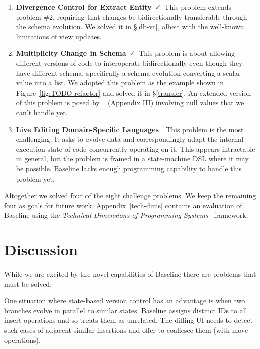 \documentclass[english,submission]{programming}
\theoremstyle{definition}
\newcommand{\redCross}{\textcolor{red}{\ \faTimes\ }}
\newcommand{\greenCheck}{\textcolor{ForestGreen}{\ \faCheck\ }}
\newcommand{\citet}[1]{\citeauthor*{#1}~\cite{#1}}
\begin{document}
\begin{enumerate}
  \item \textbf{Divergence Control for Extract Entity}\greenCheck This problem extends problem \#2, requiring that changes be bidirectionally transferable through the schema evolution. We solved it in \S\ref{db-vc}, albeit with the well-known limitations of view updates.

  \item \textbf{Multiplicity Change in Schema}\greenCheck This problem is about allowing different versions of code to interoperate bidirectionally even though they have different schema, specifically a schema evolution converting a scalar value into a list. We adopted this problem as the example shown in Figure~\ref{fig:TODO-refactor} and solved it in \S\ref{transfer}. An extended version of this problem is posed by \citet{Cambria} (Appendix III) involving null values that we can't handle yet.

  \item \textbf{Live Editing Domain-Specific Languages}\redCross This problem is the most challenging. It asks to evolve data and correspondingly adapt the internal execution state of code concurrently operating on it. This appears intractable in general, but the problem is framed in a state-machine DSL where it may be possible. Baseline lacks enough programming capability to handle this problem yet.

\end{enumerate}

Altogether we solved four of the eight challenge problems. We keep the remaining four as goals for future work. Appendix~\ref{tech-dims} contains an evaluation of Baseline using the \textit{Technical Dimensions of Programming Systems}~\cite{techdims} framework.



\section{Discussion}\label{discussion}

While we are excited by the novel capabilities of Baseline there are problems that must be solved:

One situation where state-based version control has an advantage is when
two branches evolve in parallel to similar states. Baseline assigns distinct IDs to all insert operations and so treats them as unrelated. The diffing UI needs to detect such cases of adjacent similar insertions and offer to coallesce them (with \textsf{move} operations).
\end{document}
